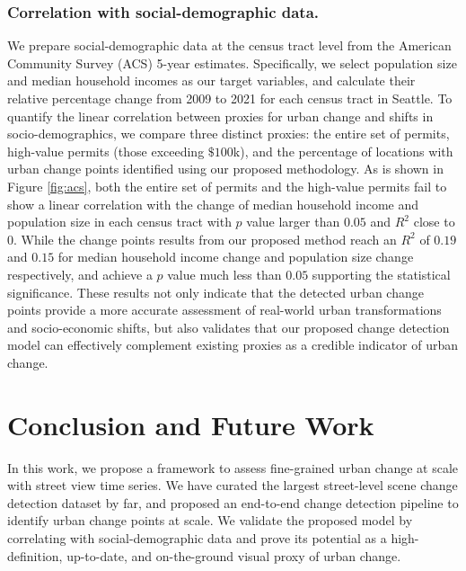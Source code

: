 \documentclass[letterpaper]{article} %
\begin{document}
\subsubsection{Correlation with social-demographic data.} 
We prepare social-demographic data at the census tract level from the American Community Survey (ACS) 5-year estimates. Specifically, we select population size and median household incomes as our target variables, and calculate their relative percentage change from 2009 to 2021 for each census tract in Seattle. 
To quantify the linear correlation between proxies for urban change and shifts in socio-demographics, we compare three distinct proxies: the entire set of permits, high-value permits (those exceeding $\$100$k), and the percentage of locations with urban change points identified using our proposed methodology.
As is shown in Figure \ref{fig:acs}, both the entire set of permits and the high-value permits fail to show a linear correlation with the change of median household income and population size in each census tract with $p$ value larger than $0.05$ and $R^2$ close to $0$. 
While the change points results from our proposed method reach an $R^2$ of $0.19$ and $0.15$ for median household income change and population size change respectively, and achieve a $p$ value much less than $0.05$ supporting the statistical significance.
These results not only indicate that the detected urban change points provide a more accurate assessment of real-world urban transformations and socio-economic shifts, but also validates that our proposed change detection model can effectively complement existing proxies as a credible indicator of urban change.

\section{Conclusion and Future Work}
In this work, we propose a framework to assess fine-grained urban change at scale with street view time series. We have curated the largest street-level scene change detection dataset by far, and proposed an end-to-end change detection pipeline to identify urban change points at scale. We validate the proposed model by correlating with social-demographic data and prove its potential as a high-definition, up-to-date, and on-the-ground visual proxy of urban change.
\end{document}
